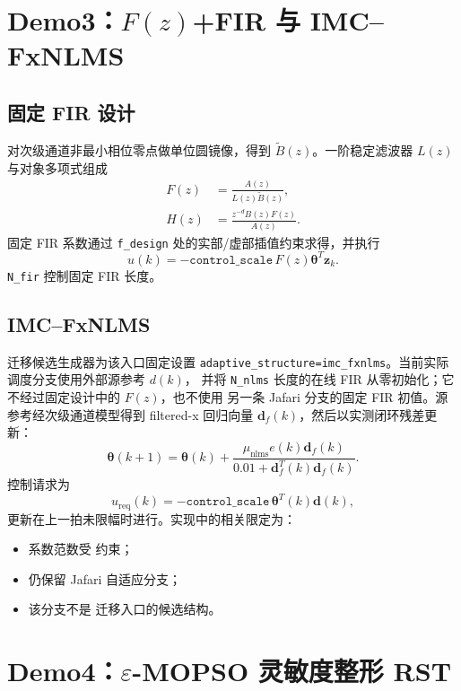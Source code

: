 \documentclass[UTF8,11pt,a4paper]{ctexart}
\begin{document}
\section{Demo3：\texorpdfstring{$F(z)$+FIR}{F(z)+FIR} 与 IMC--FxNLMS}

\subsection{固定 FIR 设计}

对次级通道非最小相位零点做单位圆镜像，得到 $\widetilde B(z)$。一阶稳定滤波器 $L(z)$
与对象多项式组成
\begin{align}
F(z)&=\frac{A(z)}{L(z)\widetilde B(z)},\\
H(z)&=\frac{z^{-d}B(z)F(z)}{A(z)}.
\end{align}
固定 FIR 系数通过 \texttt{f\_design} 处的实部/虚部插值约束求得，并执行
\begin{equation}
u(k)=-\texttt{control\_scale}\,F(z)\bm\theta^T\bm z_k.
\end{equation}
\texttt{N\_fir} 控制固定 FIR 长度。

\subsection{IMC--FxNLMS}

迁移候选生成器为该入口固定设置
\texttt{adaptive\_structure=imc\_fxnlms}。当前实际调度分支使用外部源参考 $d(k)$，
并将 \texttt{N\_nlms} 长度的在线 FIR 从零初始化；它不经过固定设计中的 $F(z)$，也不使用
另一条 Jafari 分支的固定 FIR 初值。源参考经次级通道模型得到 filtered-x 回归向量
$\bm d_f(k)$，然后以实测闭环残差更新：
\begin{equation}
\bm\theta(k+1)=\bm\theta(k)
+\frac{\mu_{\mathrm{nlms}}e(k)\bm d_f(k)}
{0.01+\bm d_f^T(k)\bm d_f(k)}.
\end{equation}
控制请求为
\begin{equation}
u_{\mathrm{req}}(k)=-\texttt{control\_scale}\,\bm\theta^T(k)\bm d(k),
\end{equation}
更新在上一拍未限幅时进行。实现中的相关限定为：
\begin{itemize}
  \item 系数范数受  约束；
  \item {} 仍保留 Jafari 自适应分支；
  \item 该分支不是  迁移入口的候选结构。
\end{itemize}

\section{Demo4：\texorpdfstring{$\varepsilon$-MOPSO}{epsilon-MOPSO} 灵敏度整形 RST}
\end{document}
